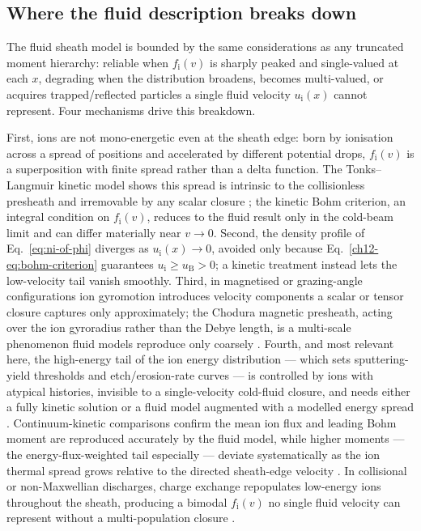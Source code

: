 \subsection{Where the fluid description breaks down}
\label{sec:breakdown}

The fluid sheath model is bounded by the same considerations as any truncated moment hierarchy: reliable when $f_{\mathrm{i}}(v)$ is sharply peaked and single-valued at each $x$, degrading when the distribution broadens, becomes multi-valued, or acquires trapped/reflected particles a single fluid velocity $u_{\mathrm{i}}(x)$ cannot represent. Four mechanisms drive this breakdown.

First, ions are not mono-energetic even at the sheath edge: born by ionisation across a spread of positions and accelerated by different potential drops, $f_{\mathrm{i}}(v)$ is a superposition with finite spread rather than a delta function. The Tonks--Langmuir kinetic model shows this spread is intrinsic to the collisionless presheath and irremovable by any scalar closure \cite{ref0665,ref0666}; the kinetic Bohm criterion, an integral condition on $f_{\mathrm{i}}(v)$, reduces to the fluid result only in the cold-beam limit and can differ materially near $v\to0$. Second, the density profile of Eq.~\eqref{eq:ni-of-phi} diverges as $u_{\mathrm{i}}(x)\to0$, avoided only because Eq.~\eqref{ch12-eq:bohm-criterion} guarantees $u_{\mathrm{i}}\ge u_{\mathrm{B}}>0$; a kinetic treatment instead lets the low-velocity tail vanish smoothly. Third, in magnetised or grazing-angle configurations ion gyromotion introduces velocity components a scalar or tensor closure captures only approximately; the Chodura magnetic presheath, acting over the ion gyroradius rather than the Debye length, is a multi-scale phenomenon fluid models reproduce only coarsely \cite{ref0017,ref0018}. Fourth, and most relevant here, the high-energy tail of the ion energy distribution — which sets sputtering-yield thresholds and etch/erosion-rate curves — is controlled by ions with atypical histories, invisible to a single-velocity cold-fluid closure, and needs either a fully kinetic solution or a fluid model augmented with a modelled energy spread \cite{ref0083}. Continuum-kinetic comparisons confirm the mean ion flux and leading Bohm moment are reproduced accurately by the fluid model, while higher moments — the energy-flux-weighted tail especially — deviate systematically as the ion thermal spread grows relative to the directed sheath-edge velocity \cite{ref0659}. In collisional or non-Maxwellian discharges, charge exchange repopulates low-energy ions throughout the sheath, producing a bimodal $f_{\mathrm{i}}(v)$ no single fluid velocity can represent without a multi-population closure \cite{ref0077,ref0090}.

